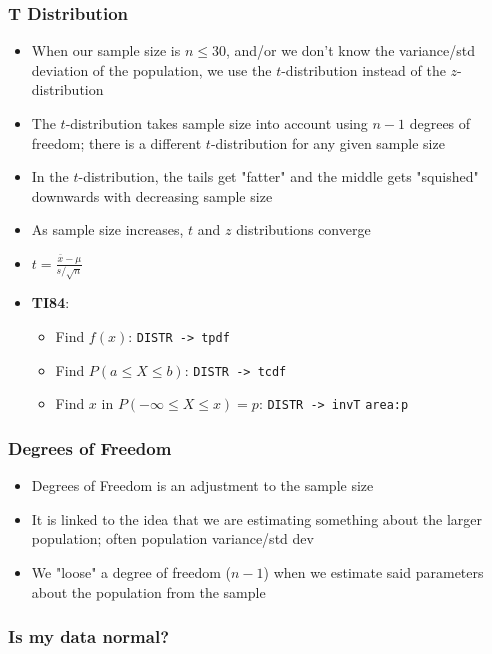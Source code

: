 \documentclass{article}
\newcommand{\code}[1]{\colorbox{light-gray}{\texttt{#1}}}
\begin{document}
\subsubsection{T Distribution}

\begin{itemize}
    \item When our sample size is $n \leq 30$, and/or we don't know the variance/std deviation of the population, we use the $t$-distribution instead of the $z$-distribution
    \item The $t$-distribution takes sample size into account using $n-1$ degrees of freedom; there is a different $t$-distribution for any given sample size
    \item In the $t$-distribution, the tails get "fatter" and the middle gets "squished" downwards with decreasing sample size
    \item As sample size increases, $t$ and $z$ distributions converge
    \item $t=\frac{\bar{x}-\mu}{s/\sqrt{n}}$
    \item \textbf{TI84}:
    \begin{itemize}
        \item Find $f(x)$: \code{DISTR -> tpdf}
        \item Find $P(a\leq X\leq b)$: \code{DISTR -> tcdf} 
        \item Find $x$ in $P(-\infty \leq X\leq x)=p$: \code{DISTR -> invT} \code{area:p}
    \end{itemize}
\end{itemize}

\subsubsection{Degrees of Freedom}

\begin{itemize}
    \item Degrees of Freedom is an adjustment to the sample size
    \item It is linked to the idea that we are estimating something about the larger population; often population variance/std dev
    \item We "loose" a degree of freedom ($n-1$) when we estimate said parameters about the population from the sample
\end{itemize}

\subsubsection{Is my data normal?}
\end{document}

